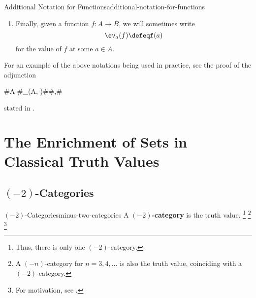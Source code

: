 \begin{notation}{Additional Notation for Functions}{additional-notation-for-functions}
\begin{enumerate}
\begin{enumerate}
            \end{enumerate}
        \item\label{additional-notation-for-functions-4}Finally, given a function $f\colon A\to B$, we will sometimes write
            \[
                \ev_{a}(f)%
                \defeq%
                f(a)%
            \]%
            for the value of $f$ at some $a\in A$.
    \end{enumerate}
    For an example of the above notations being used in practice, see the proof of the adjunction
    \begin{webcompile}
        \AdjunctionShort#A\times -#{\Hom_{\Sets}(A,-)}#\Sets#\Sets,#
    \end{webcompile}
    stated in .
\end{notation}
\section{The Enrichment of Sets in Classical Truth Values}\label{section-the-enrichment-of-sets-in-classical-truth-values}
\subsection{\texorpdfstring{$(-2)$}{(-2)}-Categories}\label{subsection-minus-two-categories}
\begin{definition}{$(-2)$-Categories}{minus-two-categories}%
    A \textbf{$(-2)$-category} is the  truth value.%
    \footnote{%
        Thus, there is only one $(-2)$-category.
    }%
    \footnote{%
        A $(-n)$-category for $n=3,4,\ldots$ is also the  truth value, coinciding with a $(-2)$-category.
    }%
    \footnote{%
        For motivation, see \cite[p.~13]{lectures-on-n-categories-and-cohomology}.
        \par\vspace*{\TCBBoxCorrection}
    }%
\end{definition}

